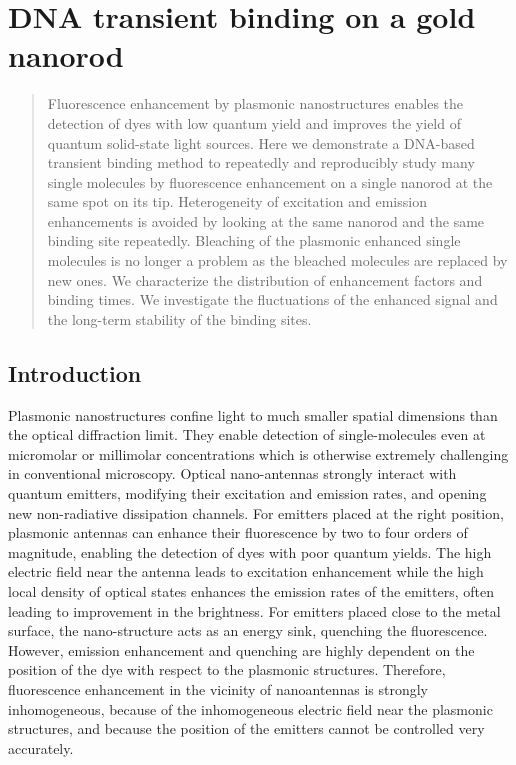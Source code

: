  \chapter{DNA transient binding on a gold nanorod}
\label{chapter:transient}
\graphicspath{{./chapters/c5_transient_binding/figures/}}

\begin{abstract}
  Fluorescence enhancement by plasmonic nanostructures enables the detection of dyes with low quantum yield and improves the yield of quantum solid-state light sources.
  Here we demonstrate a DNA-based transient binding method to repeatedly and reproducibly study many single molecules by fluorescence enhancement on a single nanorod at the same spot on its tip.
  Heterogeneity of excitation and emission enhancements is avoided by looking at the same nanorod and the same binding site repeatedly.
  Bleaching of the plasmonic enhanced single molecules is no longer a problem as the bleached molecules are replaced by new ones.
  We characterize the distribution of enhancement factors and binding times. We investigate the fluctuations of the enhanced signal and the long-term stability of the binding sites.
\end{abstract}
\newpage
\section{Introduction}
Plasmonic nanostructures confine light to much smaller spatial dimensions than the optical diffraction limit. They enable detection of single-molecules even at micromolar or millimolar concentrations which is otherwise extremely challenging in conventional microscopy.\cite{levene2003zeromode,punj2013a,schuller2010plasmonics}
Optical nano-antennas strongly interact with quantum emitters, modifying their excitation and emission rates, and opening new non-radiative dissipation channels.
For emitters placed at the right position, plasmonic antennas can enhance their fluorescence by two to four orders of magnitude, enabling the detection of dyes with poor quantum yields.\cite{lakowicz2005radiative,anger2006enhancement,kinkhabwala2009large,acuna2012fluorescence,yuan2013thousandfold,khatua2014resonant}
The high electric field near the antenna leads to excitation enhancement while the high local density of optical states enhances the emission rates of the emitters, often leading to improvement in the brightness.
For emitters placed close to the metal surface, the nano-structure acts as an energy sink, quenching the fluorescence.\cite{seelig2007nanoparticleinduced,muskens2007strong,acuna2012distance,matsuzaki2017strong}
However, emission enhancement and quenching are highly dependent on the position of the dye with respect to the plasmonic structures. Therefore, fluorescence enhancement in the vicinity of nanoantennas is strongly inhomogeneous, because of the inhomogeneous electric field near the plasmonic structures, and because the position of the emitters cannot be controlled very accurately. 

